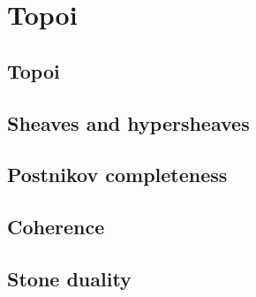
\section{Topoi}%
\label{sec:topoi}

\subsection{Topoi}%
\label{sub:topoi}

\subsection{Sheaves and hypersheaves}%
\label{sub:sheaves_and_hypersheaves}

\subsection{Postnikov completeness}%
\label{sub:postnikov_complete}

\subsection{Coherence}%
\label{sub:coherence}

\subsection{Stone duality}%
\label{sub:stone_duality}

